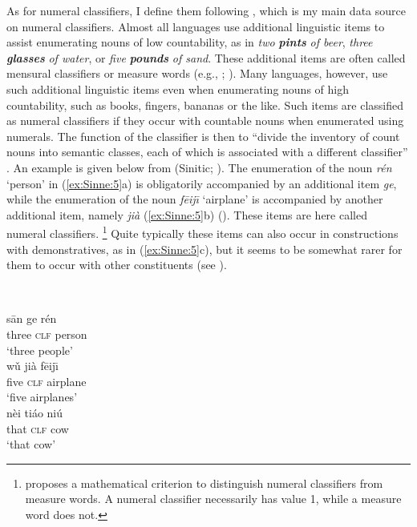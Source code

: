 \documentclass[output=collectionpaper]{langsci/langscibook}
\begin{document}
As for numeral classifiers, I define them following \citet{Gil2013}, which is my main data source on numeral classifiers. Almost all languages use additional linguistic items to assist enumerating nouns of low countability, as in  \textit{two} \textbf{\textit{pints}} \textit{of beer}, \textit{three} \textbf{\textit{glasses}} \textit{of water}, or \textit{five} \textbf{\textit{pounds}} \textit{of sand}. These additional items are often called mensural classifiers or measure words (e.g., \citealt[260--261]{Grinevald2002}; \citealt{Her2012}). Many languages, however, use such additional linguistic items even when enumerating nouns of high countability, such as books, fingers, bananas or the like. Such items are classified as numeral classifiers if they occur with countable nouns when enumerated using numerals. The function of the classifier is then to ``divide the inventory of count nouns into semantic classes, each of which is associated with a different classifier'' \citep{Gil2013}. An example is given below from  (Sinitic; ). The enumeration of the noun \textit{rén} `person' in (\ref{ex:Sinne:5}a) is obligatorily accompanied by an additional item \textit{ge}, while the enumeration of the noun \textit{f\=eij\=\i} `airplane' is accompanied by another additional item, namely \textit{jià} (\ref{ex:Sinne:5}b) (\citealt[104]{Li1981}). These items are here called numeral classifiers.%
\footnote{\citet{Her2012} proposes a mathematical criterion to distinguish numeral classifiers from measure words. A numeral classifier necessarily has value 1, while a measure word does not.} %
Quite typically these items can also occur in constructions with demonstratives, as in (\ref{ex:Sinne:5}c), but it seems to be somewhat rarer for them to occur with other constituents (see \citealt[206--220]{Aikhenvald2000}).

\ea
\label{ex:Sinne:5}
\\
\begin{xlist}
\ex
\gll s\=an ge rén\\
three \textsc{clf} person\\
\glt `three people'\\
\ex
\gll w\v{u} jià f\=eij\=\i\\
five \textsc{clf} airplane\\
\glt `five airplanes'\\
\ex
\gll nèi tiáo niú\\
that \textsc{clf} cow\\
\glt `that cow'
\end{xlist}
\z
\end{document}
